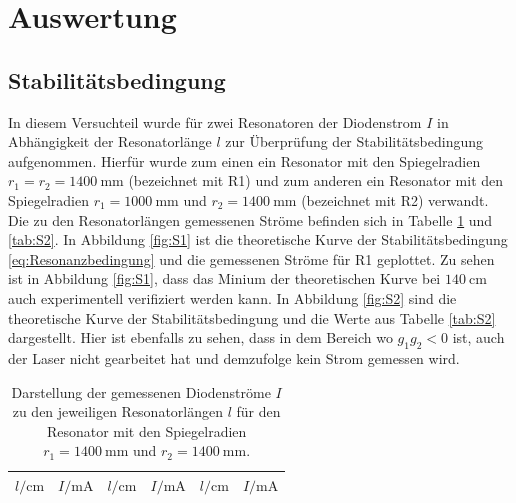 

\section{Auswertung}

\subsection{Stabilitätsbedingung}
\label{sec:Stabilitätsbedingung}

In diesem Versuchteil wurde für zwei Resonatoren der Diodenstrom $I$ in
Abhängigkeit der Resonatorlänge $l$ zur Überprüfung der
Stabilitätsbedingung %
aufgenommen. Hierfür wurde zum einen ein Resonator mit den Spiegelradien
$r_1 = r_2 = \SI{1400}{\mm}$ (bezeichnet mit R1)
und zum anderen ein Resonator mit den
Spiegelradien $r_1 = \SI{1000}{\mm}$ und $r_2 = \SI{1400}{\mm}$
(bezeichnet mit R2) verwandt.
Die zu den Resonatorlängen gemessenen Ströme befinden sich in Tabelle
\ref{tab:S1} und \ref{tab:S2}.
In Abbildung \ref{fig:S1} ist die theoretische Kurve der Stabilitätsbedingung
\ref{eq:Resonanzbedingung} und die gemessenen Ströme für R1 geplottet.
Zu sehen ist in Abbildung \ref{fig:S1}, dass das Minium der theoretischen Kurve
bei $\SI{140}{\cm}$ auch experimentell verifiziert werden kann.
In Abbildung \ref{fig:S2} sind die theoretische Kurve der Stabilitätsbedingung
und die Werte aus Tabelle \ref{tab:S2} dargestellt.
Hier ist ebenfalls zu sehen, dass in dem Bereich wo $g_1g_2 < 0$ ist, auch der
Laser nicht gearbeitet hat und demzufolge kein Strom gemessen wird.

\begin{table}
	\centering
	\begin{tabular}{cc|cc|cc}
		\midrule
		\midrule
		$l/\si{\cm}$ & $I/\si{\mA}$ & $l/\si{\cm}$ & $I/\si{\mA}$ &
		$l/\si{\cm}$ & $I/\si{\mA}$ \\
		\midrule
		
		\midrule
		\midrule
	\end{tabular}
	\caption{Darstellung der gemessenen Diodenströme $I$ zu den jeweiligen
		Resonatorlängen $l$ für den Resonator mit den Spiegelradien
		$r_1 = \SI{1400}{\milli\meter}$ und $r_2 = \SI{1400}{\milli\meter}$.}
	\label{tab:S1}
\end{table}

